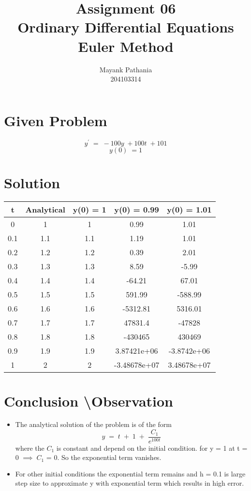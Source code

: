 \documentclass{article}
\title{
    \textbf{Assignment 06\\}
    Ordinary Differential Equations\\
    Euler Method\\}
\author{Mayank Pathania\\204103314}
\begin{document}
    \maketitle
    \section{Given Problem}
        \[y^{'}\;=\;-100y\;+100t\;+101\]
        \[y(0)\;=1\]
    \section{Solution}
        \begin{center}
                \begin{tabular}{|c|c|c|c|c|}
                    \hline
                    t & Analytical & y(0) = 1 & y(0) = 0.99 & y(0) = 1.01\\
                    \hline
                    0 & 1 & 1 & 0.99 & 1.01\\
                    \hline
                    0.1	& 1.1 & 1.1 & 1.19 & 1.01\\
                    \hline
                    0.2	& 1.2 & 1.2 & 0.39 & 2.01\\
                    \hline
                    0.3	& 1.3 & 1.3 & 8.59 & -5.99\\
                    \hline
                    0.4	& 1.4 & 1.4 & -64.21 & 67.01\\
                    \hline
                    0.5	& 1.5 & 1.5 & 591.99 & -588.99\\
                    \hline
                    0.6	& 1.6 & 1.6 & -5312.81 & 5316.01\\
                    \hline
                    0.7	& 1.7 & 1.7 & 47831.4 & -47828\\
                    \hline
                    0.8	& 1.8 & 1.8 & -430465 & 430469\\
                    \hline
                    0.9	& 1.9 & 1.9 & 3.87421e+06 & -3.8742e+06\\
                    \hline
                    1 & 2 & 2 & -3.48678e+07 & 3.48678e+07\\
                    \hline
                \end{tabular}
        \end{center}
    
    \section{Conclusion \textbackslash Observation}
    \begin{itemize}
        \item The analytical solution of the problem is of the form \[y\;=\;t\;+\;1\;+\;\frac{C_1}{e^{100t}}\] where the $C_1$ is constant and depend on the initial condition. for  y = 1 at t = 0 $\implies\;C_1$ = 0. So the exponential term vanishes.
        \item For other initial conditions the exponential term remains and h = 0.1 is large step size to approximate y with exponential term which results in high error.
    \end{itemize}
\end{document}
